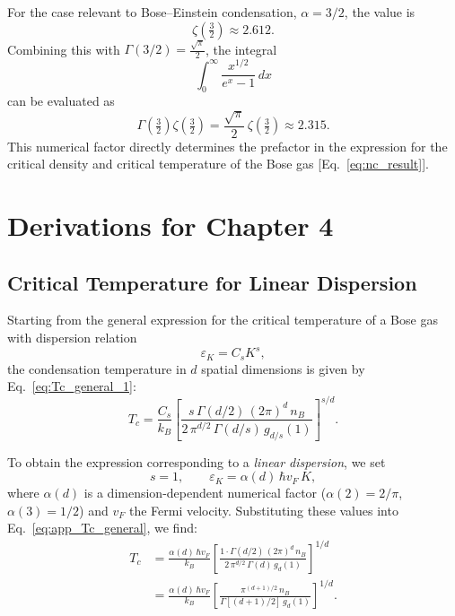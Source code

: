 For the case relevant to Bose--Einstein condensation, \( \alpha = 3/2 \), the value is
\[
    \zeta\!\left(\tfrac{3}{2}\right) \approx 2.612.
\]
Combining this with \( \Gamma(3/2) = \tfrac{\sqrt{\pi}}{2} \), the integral
\[
    \int_0^{\infty} \frac{x^{1/2}}{e^x - 1}\, dx
\]
can be evaluated as
\[
    \Gamma\!\left(\tfrac{3}{2}\right) \zeta\!\left(\tfrac{3}{2}\right)
    = \frac{\sqrt{\pi}}{2}\, \zeta\!\left(\tfrac{3}{2}\right)
    \approx 2.315.
\]
This numerical factor directly determines the prefactor in the expression for the critical density and critical temperature of the Bose gas [Eq.~\eqref{eq:nc_result}].

\chapter{Derivations for Chapter 4}
\label{app:BCS_BEC-derivation}
\section*{Critical Temperature for Linear Dispersion}
\label{app:Tc_linear_dispersion}

Starting from the general expression for the critical temperature of a Bose gas with dispersion relation
\[
\varepsilon_K = C_s K^s,
\]
the condensation temperature in \(d\) spatial dimensions is given by Eq.~\eqref{eq:Tc_general_1}:
\begin{equation}
T_c = \frac{C_s}{k_B}
\left[
    \frac{s\, \Gamma(d/2)\, (2\pi)^d\, n_B}
         {2\, \pi^{d/2}\, \Gamma(d/s)\, g_{d/s}(1)}
\right]^{s/d}.
\label{eq:app_Tc_general}
\end{equation}

To obtain the expression corresponding to a \textit{linear dispersion}, we set
\[
s = 1, \qquad \varepsilon_K = \alpha(d)\,\hbar v_F\, K,
\]
where \(\alpha(d)\) is a dimension-dependent numerical factor (\(\alpha(2) = 2/\pi\), \(\alpha(3) = 1/2\)) and \(v_F\) the Fermi velocity.  
Substituting these values into Eq.~\eqref{eq:app_Tc_general}, we find:
\begin{align}
T_c 
&= \frac{\alpha(d)\, \hbar v_F}{k_B}
\left[
    \frac{1 \cdot \Gamma(d/2)\, (2\pi)^d\, n_B}
         {2\, \pi^{d/2}\, \Gamma(d)\, g_d(1)}
\right]^{1/d} \nonumber \\[6pt]
&= \frac{\alpha(d)\, \hbar v_F}{k_B}
\left[
    \frac{\pi^{(d+1)/2}\, n_B}
         {\Gamma\!\left[(d+1)/2\right]\, g_d(1)}
\right]^{1/d}.
\label{eq:app_Tc_linear_final}
\end{align}

